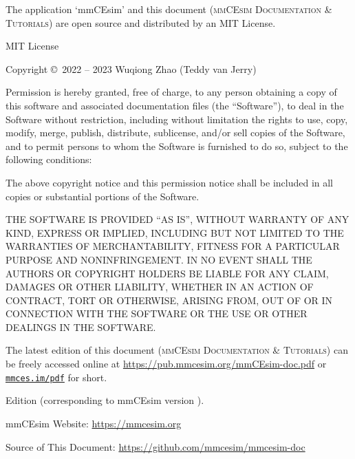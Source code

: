 \vspace*{-\fill}

\noindent
The application `mmCEsim' and this document
(\textsc{mmCEsim Documentation \& Tutorials})
are open source and distributed by an MIT License.
\newline

\noindent
MIT License
\newline

\noindent
Copyright \copyright~2022 -- 2023 Wuqiong Zhao (Teddy van Jerry)
\newline

\noindent
Permission is hereby granted, free of charge, to any person obtaining a copy
of this software and associated documentation files (the ``Software''), to deal
in the Software without restriction, including without limitation the rights
to use, copy, modify, merge, publish, distribute, sublicense, and/or sell
copies of the Software, and to permit persons to whom the Software is
furnished to do so, subject to the following conditions:
\newline

\noindent
The above copyright notice and this permission notice shall be included in all
copies or substantial portions of the Software.
\newline

\noindent
THE SOFTWARE IS PROVIDED ``AS IS'', WITHOUT WARRANTY OF ANY KIND, EXPRESS OR
IMPLIED, INCLUDING BUT NOT LIMITED TO THE WARRANTIES OF MERCHANTABILITY,
FITNESS FOR A PARTICULAR PURPOSE AND NONINFRINGEMENT. IN NO EVENT SHALL THE
AUTHORS OR COPYRIGHT HOLDERS BE LIABLE FOR ANY CLAIM, DAMAGES OR OTHER
LIABILITY, WHETHER IN AN ACTION OF CONTRACT, TORT OR OTHERWISE, ARISING FROM,
OUT OF OR IN CONNECTION WITH THE SOFTWARE OR THE USE OR OTHER DEALINGS IN THE
SOFTWARE.
\newline
\newline

\noindent
The latest edition of this document (\textsc{mmCEsim Documentation \& Tutorials})
can be freely accessed online at \url{https://pub.mmcesim.org/mmCEsim-doc.pdf}
or \href{https://mmces.im/pdf}{\texttt{mmces.im/pdf}} for short.
\newline

\noindent
Edition \mmCEsimDate{}
(corresponding to mmCEsim version \mmCEsimVersion).

\vfill
\noindent
mmCEsim Website: \url{https://mmcesim.org}

\noindent
Source of This Document: \url{https://github.com/mmcesim/mmcesim-doc}
